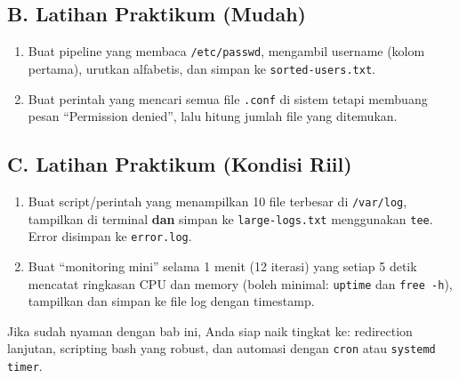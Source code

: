 \subsection*{B. Latihan Praktikum (Mudah)}
\begin{enumerate}
    \item Buat pipeline yang membaca \texttt{/etc/passwd}, mengambil username (kolom pertama), urutkan alfabetis, dan simpan ke \texttt{sorted-users.txt}.
    \item Buat perintah yang mencari semua file \texttt{.conf} di sistem tetapi membuang pesan ``Permission denied'', lalu hitung jumlah file yang ditemukan.
\end{enumerate}

\subsection*{C. Latihan Praktikum (Kondisi Riil)}
\begin{enumerate}
    \item Buat script/perintah yang menampilkan 10 file terbesar di \texttt{/var/log}, tampilkan di terminal \textbf{dan} simpan ke \texttt{large-logs.txt} menggunakan \texttt{tee}. Error disimpan ke \texttt{error.log}.
    \item Buat ``monitoring mini'' selama 1 menit (12 iterasi) yang setiap 5 detik mencatat ringkasan CPU dan memory (boleh minimal: \texttt{uptime} dan \texttt{free -h}),
    tampilkan dan simpan ke file log dengan timestamp.
\end{enumerate}

\begin{tipbox}
Jika sudah nyaman dengan bab ini, Anda siap naik tingkat ke: redirection lanjutan, scripting bash yang robust, dan automasi dengan \texttt{cron} atau \texttt{systemd timer}.
\end{tipbox}